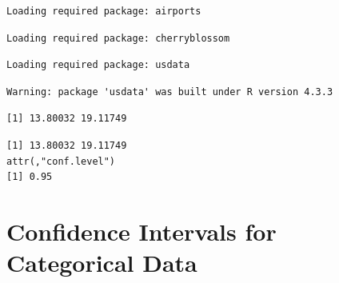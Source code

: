 \documentclass[
  letterpaper,
  DIV=11,
  numbers=noendperiod]{scrreprt}
\newenvironment{Shaded}{\begin{snugshade}}{\end{snugshade}}
\newcommand{\AttributeTok}[1]{\textcolor[rgb]{0.40,0.45,0.13}{#1}}
\newcommand{\CommentTok}[1]{\textcolor[rgb]{0.37,0.37,0.37}{#1}}
\newcommand{\DecValTok}[1]{\textcolor[rgb]{0.68,0.00,0.00}{#1}}
\newcommand{\FunctionTok}[1]{\textcolor[rgb]{0.28,0.35,0.67}{#1}}
\newcommand{\NormalTok}[1]{\textcolor[rgb]{0.00,0.23,0.31}{#1}}
\newcommand{\OtherTok}[1]{\textcolor[rgb]{0.00,0.23,0.31}{#1}}
\newcommand{\SpecialCharTok}[1]{\textcolor[rgb]{0.37,0.37,0.37}{#1}}
\begin{document}
\begin{verbatim}
Loading required package: airports
\end{verbatim}

\begin{verbatim}
Loading required package: cherryblossom
\end{verbatim}

\begin{verbatim}
Loading required package: usdata
\end{verbatim}

\begin{verbatim}
Warning: package 'usdata' was built under R version 4.3.3
\end{verbatim}

\begin{Shaded}
\end{Shaded}

\begin{verbatim}
[1] 13.80032 19.11749
\end{verbatim}

\begin{Shaded}
\end{Shaded}

\begin{verbatim}
[1] 13.80032 19.11749
attr(,"conf.level")
[1] 0.95
\end{verbatim}

\section{Confidence Intervals for Categorical
Data}\label{confidence-intervals-for-categorical-data}
\end{document}
